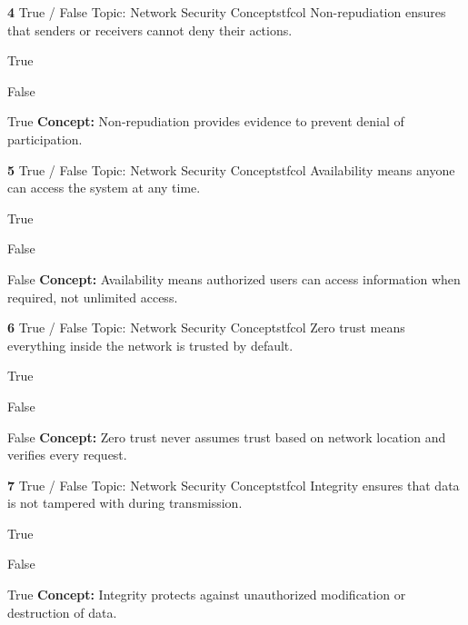 \documentclass[10pt,a4paper]{article}
\begin{document}
\begin{qcard}{\color{white}\textbf{4} \hfill \small True / False \textbar{} Topic: Network Security Concepts}{tfcol}
Non-repudiation ensures that senders or receivers cannot deny their actions.

\begin{qoptions}
\item True
\item False
\end{qoptions}
\begin{explainbox}{True}
\textbf{Concept:} Non-repudiation provides evidence to prevent denial of participation.
\end{explainbox}
\end{qcard}

\begin{qcard}{\color{white}\textbf{5} \hfill \small True / False \textbar{} Topic: Network Security Concepts}{tfcol}
Availability means anyone can access the system at any time.

\begin{qoptions}
\item True
\item False
\end{qoptions}
\begin{explainbox}{False}
\textbf{Concept:} Availability means authorized users can access information when required, not unlimited access.
\end{explainbox}
\end{qcard}

\begin{qcard}{\color{white}\textbf{6} \hfill \small True / False \textbar{} Topic: Network Security Concepts}{tfcol}
Zero trust means everything inside the network is trusted by default.

\begin{qoptions}
\item True
\item False
\end{qoptions}
\begin{explainbox}{False}
\textbf{Concept:} Zero trust never assumes trust based on network location and verifies every request.
\end{explainbox}
\end{qcard}

\begin{qcard}{\color{white}\textbf{7} \hfill \small True / False \textbar{} Topic: Network Security Concepts}{tfcol}
Integrity ensures that data is not tampered with during transmission.

\begin{qoptions}
\item True
\item False
\end{qoptions}
\begin{explainbox}{True}
\textbf{Concept:} Integrity protects against unauthorized modification or destruction of data.
\end{explainbox}
\end{qcard}
\end{document}
